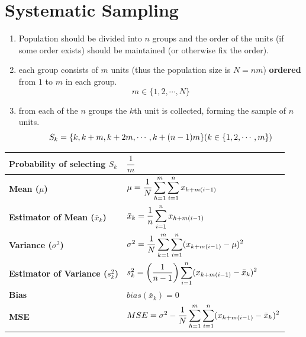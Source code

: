 \section{Systematic Sampling \cite{ism-1}}\label{Systematic Sampling}

\begin{enumerate}
    \item Population should be divided into $n$ groups and the order of the units (if some order exists) should be maintained (or otherwise fix the order).

    \item each group consists of $m$ units (thus the population size is $N = nm$) \textbf{ordered} from $1$ to $m$ in each group.
    \[
        m \in \{1,2,\cdots,N\}
    \]

    \item from each of the $n$ groups the $k$th unit is collected, forming the sample of $n$ units. 
    \[
        S_k = \{ k, k+m,k+2m,\cdots,k+(n-1)m \}
        \hfill
        (k \in \{1,2,\cdots,m\})
    \]
\end{enumerate}

\begin{longtable}{|p{5cm}|p{9cm}|}
    \hline\endfirsthead
    \hline\endhead
    \hline\endfoot
    \hline\endlastfoot

    \textbf{Probability of selecting $S_k$} & $\dfrac{1}{m}$\\[1ex]
    \hline

    \textbf{Mean ($\mu$)} & $
        \mu = \dfrac{1}{N}
        \displaystyle\sum_{h=1}^{m}
        \displaystyle\sum_{i=1}^{n} 
        x_{h+m(i-1)}
    $\\[1ex]
    \hline

    \textbf{Estimator of Mean ($\bar{x}_k$)} & $
        \bar{x}_k = 
        \dfrac{1}{n} \displaystyle\sum_{i=1}^{n}
        x_{h+m(i-1)}
    $\\[1ex]
    \hline

    \textbf{Variance ($\sigma^2$)} & $
        \sigma^2 = 
        \dfrac{1}{N}
        \displaystyle\sum_{k=1}^{m}
        \displaystyle\sum_{i=1}^{n}
        (x_{k+m(i-1)} - \mu)^2
    $\\[1ex]
    \hline

    \textbf{Estimator of Variance ($s_k^2$)} & $
        s_k^2 = \left(\dfrac{1}{n-1}\right)
        \displaystyle\sum_{i=1}^{n}
        (x_{k+m(i-1)} - \bar{x}_k)^2
    $\\[1ex]
    \hline

    \textbf{Bias} & $bias(\bar{x}_k) = 0$\\
    \hline

    \textbf{MSE} & $
        MSE = \sigma^2 -
        \dfrac{1}{N}
        \displaystyle\sum_{h=1}^{m}
        \displaystyle\sum_{i=1}^{n}
        (x_{h+m(i-1)} - \bar{x}_h)^2
    $\\[1ex]
    \hline
\end{longtable}


